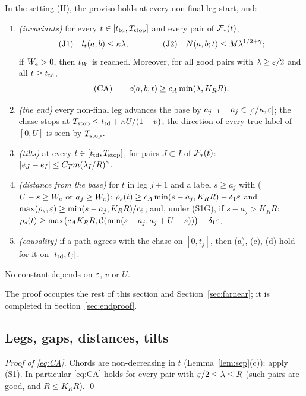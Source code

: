 \begin{theorem}\label{thm:end}
In the setting \textup{(H)}, the proviso holds at every non-final leg start, and:
\begin{enumerate}
\item[(a)] \emph{(invariants)} for every $t\in[t_{\mathrm{td}},T_{\mathrm{stop}}]$ and every pair of $\mathcal F_*(t)$,
\begin{equation}\label{eq:J}
\textup{(J1)}\quad l_t(a,b)\le\kappa\lambda,\qquad\qquad \textup{(J2)}\quad N(a,b;t)\le M\lambda^{1/2+\gamma};
\end{equation}
if $W_{\mathrm e}>0$, then $t_W$ is reached. Moreover, for all good pairs with $\lambda\ge\varepsilon/2$ and all $t\ge t_{\mathrm{td}}$,
\begin{equation}\label{eq:CA}
\textup{(CA)}\qquad c(a,b;t)\ge c_A\min(\lambda,K_RR).
\end{equation}
\item[(b)] \emph{(the end)} every non-final leg advances the base by $a_{j+1}-a_j\in[\varepsilon/\kappa,\varepsilon]$; the chase stops at
$T_{\mathrm{stop}}\le t_{\mathrm{td}}+\kappa U/(1-v)$; the direction of every true label of $[0,U]$ is seen by $T_{\mathrm{stop}}$.
\item[(c)] \emph{(tilts)} at every $t\in[t_{\mathrm{td}},T_{\mathrm{stop}}]$, for pairs $J\subset I$ of $\mathcal F_*(t)$: $|e_J-e_I|\le C_T m(\lambda_I/R)^\gamma$.
\item[(d)] \emph{(distance from the base)} for $t$ in leg $j+1$ and a label $s\ge a_j$ with ($U-s\ge W_{\mathrm e}$ or $a_j\ge W_{\mathrm e}$):
$\rho_s(t)\ge c_A\min(s-a_j,K_RR)-\delta_1\varepsilon$ and $\max(\rho_s,\varepsilon)\ge\min(s-a_j,K_RR)/c_6$; and, under \textup{(S1G)}, if
$s-a_j>K_RR$: $\rho_s(t)\ge\max\bigl(c_AK_RR,\mathcal C(\min(s-a_j,a_j+U-s))\bigr)-\delta_1\varepsilon$.
\item[(e)] \emph{(causality)} if a path agrees with the chase on $[0,t_j]$, then \textup{(a)}, \textup{(c)}, \textup{(d)} hold for it on
$[t_{\mathrm{td}},t_j]$.
\end{enumerate}
No constant depends on $\varepsilon$, $v$ or $U$.
\end{theorem}

The proof occupies the rest of this section and Section~\ref{sec:farnear}; it is completed in Section~\ref{sec:endproof}.

\subsection{Legs, gaps, distances, tilts}

\emph{Proof of \eqref{eq:CA}.} Chords are non-decreasing in $t$ (Lemma~\ref{lem:sep}(c)); apply (S1). In particular \eqref{eq:CA}
holds for every pair with $\varepsilon/2\le\lambda\le R$ (such pairs are good, and $R\le K_RR$). \qed

